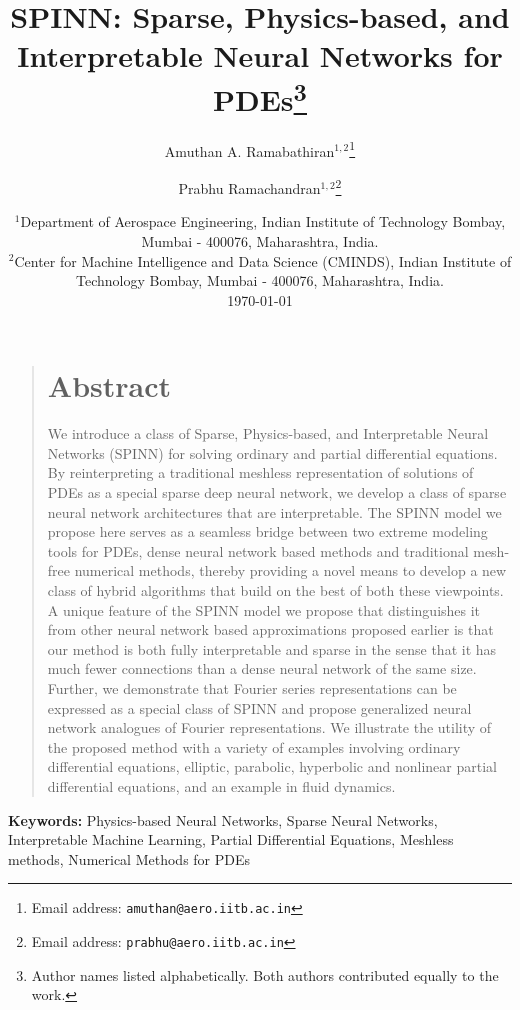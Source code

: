 \documentclass[12pt]{article}
\title{SPINN: Sparse, Physics-based, and Interpretable Neural Networks for PDEs\footnote{Author names listed alphabetically. Both authors contributed equally to the work.}}
\author{\textsf{Amuthan A. Ramabathiran}$^{1,2}$\footnote{Email address: \texttt{amuthan@aero.iitb.ac.in}} \and \textsf{Prabhu Ramachandran}$^{1,2}$\footnote{Email address: \texttt{prabhu@aero.iitb.ac.in}}}
\date{%
	$^1${\small Department of Aerospace Engineering, Indian Institute of Technology Bombay, Mumbai - 400076, Maharashtra, India.}\\[2ex]%
	$^2${\small Center for Machine Intelligence and Data Science (CMINDS), Indian Institute of Technology Bombay, Mumbai - 400076, Maharashtra, India.}\\[2ex]%
	\today
}
\providecommand{\keywords}[1]{\textbf{\textsf{Keywords:}} #1}
\begin{document}
\maketitle

\begin{quote}
\section*{Abstract}
We introduce a class of Sparse, Physics-based, and Interpretable Neural Networks (SPINN) for solving ordinary and partial differential equations. By reinterpreting a traditional meshless representation of solutions of PDEs as a special sparse deep neural network, we develop a class of sparse neural network architectures that are interpretable. The SPINN model we propose here serves as a seamless bridge between two extreme modeling tools for PDEs, dense neural network based methods and traditional mesh-free numerical methods, thereby providing a novel means to develop a new class of hybrid algorithms that build on the best of both these viewpoints. A unique feature of the SPINN model we propose that distinguishes it from other neural network based approximations proposed earlier is that our method is both fully interpretable and sparse in the sense that it has much fewer connections than a dense neural network of the same size. Further, we demonstrate that Fourier series representations can be expressed as a special class of SPINN and propose generalized neural network analogues of Fourier representations. We illustrate the utility of the proposed method with a variety of examples involving ordinary differential equations, elliptic, parabolic, hyperbolic and nonlinear partial differential equations, and an example in fluid dynamics.
\end{quote}


\keywords{Physics-based Neural Networks, Sparse Neural Networks, Interpretable Machine Learning, Partial Differential Equations, Meshless methods, Numerical Methods for PDEs}

\linenumbers
\end{document}
